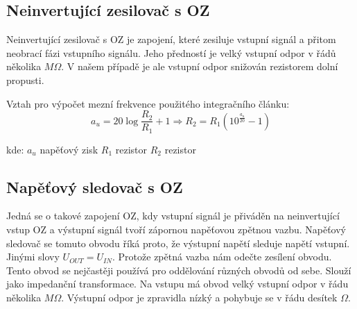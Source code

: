 		
		\subsection*{Neinvertující zesilovač s OZ}
			\indent\indent
			Neinvertující zesilovač s OZ je zapojení, které zesiluje vstupní signál a přitom neobrací fázi vstupního signálu. Jeho předností je velký vstupní odpor v řádů několika $M\Omega$. V našem případě je ale vstupní odpor snižován rezistorem dolní propusti.
			
			
			Vztah pro výpočet mezní frekvence použitého integračního článku:
			\begin{equation}
  				a_u = 20\log\frac{R_{2}}{R_1} + 1 \Rightarrow R_{2} = R_1 (10^{\frac{a_u}{20}} - 1)
  			\end{equation}		
		
			\hspace*{2cm}kde:\newline    
  			\hspace*{4cm}$a_u$ \dotfill napěťový zisk\hspace*{4cm}\newline
	  		\hspace*{4cm}$R_1$ \dotfill rezistor\hspace*{4cm}\newline
	  		\hspace*{4cm}$R_{2}$ \dotfill rezistor\hspace*{4cm}\newline
  				

  
		\subsection*{Napěťový sledovač s OZ}
			\indent\indent
			Jedná se o takové zapojení OZ, kdy vstupní signál je přiváděn na neinvertující vstup OZ a výstupní signál tvoří zápornou napěťovou zpětnou vazbu. Napěťový sledovač se tomuto obvodu říká proto, že výstupní napětí sleduje napětí vstupní. Jinými slovy $U_{OUT} = U_{IN}$. Protože zpětná vazba nám odečte zesílení obvodu. Tento obvod se nejčastěji používá pro oddělování různých obvodů od sebe. Slouží jako impedanční transformace. Na vstupu má obvod velký vstupní odpor v řádu několika $M\Omega$. Výstupní odpor je zpravidla nízký a pohybuje se v řádu desítek $\Omega$.

